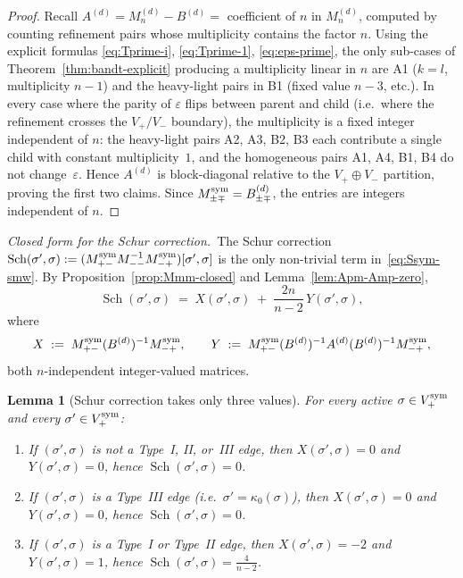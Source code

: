 \documentclass{amsart}
\newtheorem{lemma}[theorem]{Lemma}
\theoremstyle{definition}
\theoremstyle{remark}
\begin{document}
\begin{proof}
Recall $A^{(d)} = M_n^{(d)} - B^{(d)} = $ coefficient of $n$ in
$M_n^{(d)}$, computed by counting refinement pairs whose
multiplicity contains the factor $n$.  Using the explicit
formulas \eqref{eq:Tprime-i}, \eqref{eq:Tprime-1},
\eqref{eq:eps-prime}, the only sub-cases of
Theorem~\ref{thm:bandt-explicit} producing a multiplicity
linear in $n$ are A1 \textup{(}$k = l$, multiplicity $n - 1$\textup{)}
and the heavy-light pairs in B1 \textup{(}fixed value
$n - 3$, etc.\textup{)}.  In every case where the parity of
$\varepsilon$ flips between parent and child (i.e.\ where the
refinement crosses the $V_+ / V_-$ boundary), the multiplicity
is a fixed integer independent of $n$: the heavy-light pairs
A2, A3, B2, B3 each contribute a single child with constant
multiplicity~$1$, and the homogeneous pairs A1, A4, B1, B4 do
not change~$\varepsilon$.  Hence $A^{(d)}$ is block-diagonal
relative to the $V_+ \oplus V_-$ partition, proving the first
two claims.  Since $M_{\pm\mp}^{\rm sym} = B^{(d)}_{\pm\mp}$,
the entries are integers independent of $n$.
\end{proof}

\medskip
\noindent\textit{Closed form for the Schur correction.}\
The Schur correction
$\operatorname{Sch}(\sigma', \sigma)
 := (M_{+-}^{\rm sym} M_{--}^{-1}
     M_{-+}^{\rm sym})[\sigma', \sigma]$
is the only non-trivial term in~\eqref{eq:Ssym-smw}.  By
Proposition~\ref{prop:Mmm-closed} and
Lemma~\ref{lem:Apm-Amp-zero},
\begin{equation}\label{eq:Schur-XY}
  \operatorname{Sch}(\sigma', \sigma)
  \;=\; X(\sigma', \sigma)
   \;+\; \frac{2 n}{n - 2}\, Y(\sigma', \sigma),
\end{equation}
where
\[
  X \;:=\; M_{+-}^{\rm sym} (B^{(d)})^{-1} M_{-+}^{\rm sym},
  \qquad
  Y \;:=\; M_{+-}^{\rm sym} (B^{(d)})^{-1}
        A^{(d)} (B^{(d)})^{-1} M_{-+}^{\rm sym},
\]
both $n$-independent integer-valued matrices.

\begin{lemma}[Schur correction takes only three values]
\label{lem:schur-correction-active}
For every active $\sigma \in V_+^{\rm sym}$ and every
$\sigma' \in V_+^{\rm sym}$:
\begin{enumerate}
\item[\textup{(a)}] If $(\sigma', \sigma)$ is not a Type~I,
II, or~III edge, then $X(\sigma', \sigma) = 0$ and
$Y(\sigma', \sigma) = 0$, hence
$\operatorname{Sch}(\sigma', \sigma) = 0$.
\item[\textup{(b)}] If $(\sigma', \sigma)$ is a Type~III edge
\textup{(}i.e.\ $\sigma' = \kappa_0(\sigma)$\textup{)}, then
$X(\sigma', \sigma) = 0$ and $Y(\sigma', \sigma) = 0$, hence
$\operatorname{Sch}(\sigma', \sigma) = 0$.
\item[\textup{(c)}] If $(\sigma', \sigma)$ is a Type~I or
Type~II edge, then $X(\sigma', \sigma) = -2$ and
$Y(\sigma', \sigma) = 1$, hence
$\operatorname{Sch}(\sigma', \sigma) = \tfrac{4}{n - 2}$.
\end{enumerate}
\end{lemma}
\end{document}
